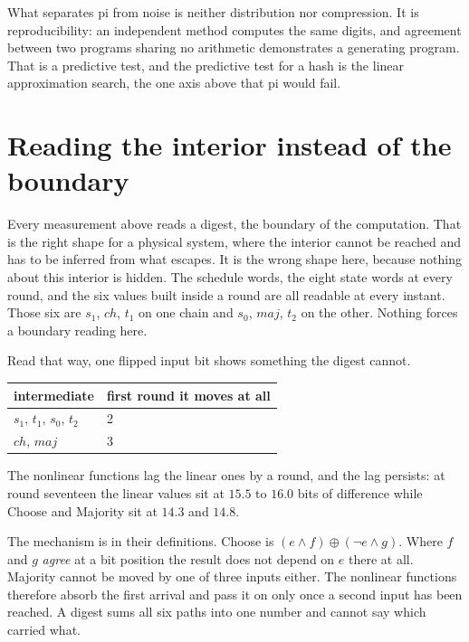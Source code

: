 What separates pi from noise is neither distribution nor compression. It is reproducibility: an independent method computes the same digits, and agreement between two programs sharing no arithmetic demonstrates a generating program. That is a predictive test, and the predictive test for a hash is the linear approximation search, the one axis above that pi would fail.

\section{Reading the interior instead of the boundary}

Every measurement above reads a digest, the boundary of the computation. That is the right shape for a physical system, where the interior cannot be reached and has to be inferred from what escapes. It is the wrong shape here, because nothing about this interior is hidden. The schedule words, the eight state words at every round, and the six values built inside a round are all readable at every instant. Those six are \(s_1\), \(\mathit{ch}\), \(t_1\) on one chain and \(s_0\), \(\mathit{maj}\), \(t_2\) on the other. Nothing forces a boundary reading here.

Read that way, one flipped input bit shows something the digest cannot.

\begin{center}
\begin{tabular}{@{}ll@{}}
\toprule
intermediate & first round it moves at all \\
\midrule
\(s_1\), \(t_1\), \(s_0\), \(t_2\) & 2 \\
\(\mathit{ch}\), \(\mathit{maj}\) & 3 \\
\bottomrule
\end{tabular}
\end{center}

The nonlinear functions lag the linear ones by a round, and the lag persists: at round seventeen the linear values sit at \(15.5\) to \(16.0\) bits of difference while Choose and Majority sit at \(14.3\) and \(14.8\).

The mechanism is in their definitions. Choose is \((e \wedge f) \oplus (\neg e \wedge g)\). Where \(f\) and \(g\) \emph{agree} at a bit position the result does not depend on \(e\) there at all. Majority cannot be moved by one of three inputs either. The nonlinear functions therefore absorb the first arrival and pass it on only once a second input has been reached. A digest sums all six paths into one number and cannot say which carried what.


